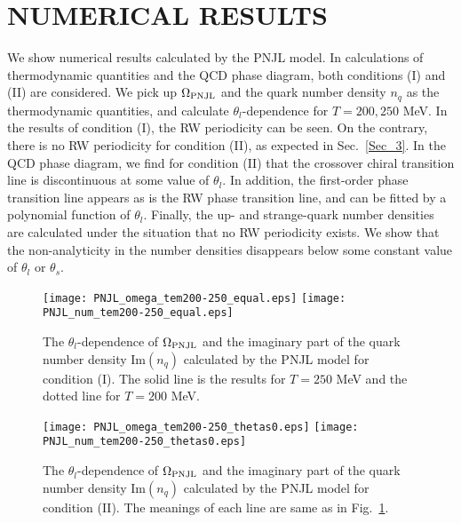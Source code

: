 \documentclass[prd,superscriptaddress,unsortedaddress,
twocolumn,showpacs,preprintnumbers,amsmath,amssymb]{revtex4}
\begin{document}
   \section{NUMERICAL RESULTS}
   \label{Sec_4}
   We show numerical results calculated by the PNJL model.
   In calculations of thermodynamic quantities
   and the QCD phase diagram,
   both conditions (I) and (II) are considered.
   We pick up $\Omega_{\rm PNJL}$ and the quark number density $n_{q}$
   as the thermodynamic quantities,
   and calculate $\theta_{l}$-dependence for $T=200, 250$ MeV.
   In the results of condition (I), the RW periodicity can be seen.
   On the contrary, there is no RW periodicity for condition (II),
   as expected in Sec.~\ref{Sec_3}.
   In the QCD phase diagram,
   we find for condition (II)
   that the crossover chiral transition line is discontinuous
   at some value of $\theta_{l}$.
   In addition, the first-order phase transition line appears
   as is the RW phase transition line,
   and can be fitted by a polynomial function of $\theta_{l}$.
   Finally, the up- and strange-quark number densities are calculated
   under the situation that no RW periodicity exists.
   We show that the non-analyticity in the number densities disappears
   below some constant value of $\theta_{l}$ or $\theta_{s}$.

     \begin{figure}
  \begin{center}
   \texttt{[image: PNJL\_omega\_tem200-250\_equal.eps]}
   \texttt{[image: PNJL\_num\_tem200-250\_equal.eps]}
   \end{center}
\caption{
     The $\theta_{l}$-dependence of $\Omega_{\rm PNJL}$
      and the imaginary part of the quark number density
      $\textrm{Im}(n_{q})$ calculated by the PNJL model
      for condition (I).
      The solid line is the results for $T=250$ MeV and the dotted line for $T=200$ MeV.
}
\label{thermodynamic_quantity1}
     \end{figure}


     \begin{figure}
  \begin{center}
   \texttt{[image: PNJL\_omega\_tem200-250\_thetas0.eps]}
   \texttt{[image: PNJL\_num\_tem200-250\_thetas0.eps]}
   \end{center}
\caption{
     The $\theta_{l}$-dependence of $\Omega_{\rm PNJL}$
      and the imaginary part of the quark number density $\textrm{Im} (n_{q})$
      calculated by the PNJL model for condition (II).
     The meanings of each line are same as in Fig.~\ref{thermodynamic_quantity1}.
}
\label{thermodynamic_quantity2}
     \end{figure}
\end{document}
